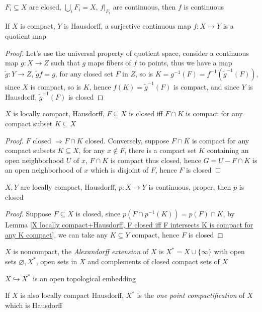 \documentclass[main]{subfiles}
\begin{document}
\begin{lemma}\label{Pasting lemma}
$F_i\subseteq X$ are closed, $\bigcup_iF_i=X$, $f|_{F_i}$ are continuous, then $f$ is continuous
\end{lemma}

\begin{lemma}\label{X compact + Y Hausdorff => f:X->Y quotient map}
If $X$ is compact, $Y$ is Hausdorff, a surjective continuous map $f:X\to Y$ is a quotient map
\end{lemma}

\begin{proof}
Let's use the universal property of quotient space, consider a continuous map $g:X\to Z$ such that $g$ maps fibers of $f$ to points, thus we have a map $\tilde g:Y\to Z$, $\tilde gf=g$, for any closed set $F$ in $Z$, so is $K=g^{-1}(F)=f^{-1}(\tilde g^{-1}(F))$, since $X$ is compact, so is $K$, hence $f(K)=\tilde g^{-1}(F)$ is compact, and since $Y$ is Hausdorff, $\tilde g^{-1}(F)$ is closed
\end{proof}

\begin{lemma}\label{X locally compact+Hausdorff, F closed iff F intersects K is compact for any K compact}
$X$ is locally compact, Hausdorff, $F\subseteq X$ is closed iff $F\cap K$ is compact for any compact subset $K\subseteq X$
\end{lemma}

\begin{proof}
$F$ closed $\Rightarrow F\cap K$ closed. Conversely, suppose $F\cap K$ is compact for any compact subsets $K\subseteq X$, for any $x\notin F$, there is a compact set $K$ containing an open neighborhood $U$ of $x$, $F\cap K$ is compact thus closed, hence $G=U-F\cap K$ is an open neighborhood of $x$ which is disjoint of $F$, hence $F$ is closed 
\end{proof}

\begin{lemma}
$X,Y$ are locally compact, Hausdorff, $p:X\rightarrow Y$ is continuous, proper, then $p$ is closed
\end{lemma}

\begin{proof}
Suppose $F\subseteq X$ is closed, since $p\left(F\cap p^{-1}(K)\right) = p(F)\cap K$, by Lemma \ref{X locally compact+Hausdorff, F closed iff F intersects K is compact for any K compact}, we can take any $K\subseteq Y$ compact, hence $F$ is closed
\end{proof}

\begin{definition}
$X$ is noncompact, the \textit{Alexandorff extension} of $X$ is $X^*=X\cup\{\infty\}$ with open sets $\varnothing, X^*$, open sets in $X$ and complements of closed compact sets of $X$ \par
$X \hookrightarrow X^*$ is an open topological embedding \par
If $X$ is also locally compact Hausdorff, $X^*$ is the \textit{one point compactification} of $X$ which is Hausdorff
\end{definition}
\end{document}
